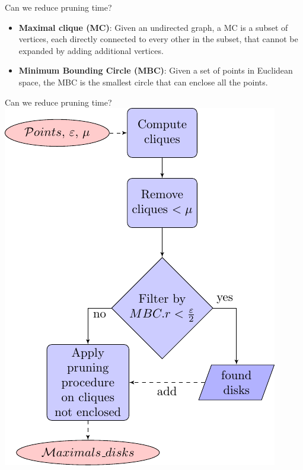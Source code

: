 \documentclass{beamer}
\begin{document}
    \begin{frame}{Can we reduce pruning time?}
        \begin{itemize}
            \item \textbf{Maximal clique (MC)}: Given an undirected graph, a MC is a subset of vertices, each directly connected to every other in the subset, 
that cannot be expanded by adding additional vertices.
            \item \textbf{Minimum Bounding Circle (MBC)}: Given a set of points in Euclidean space, the MBC is the smallest circle that can enclose all the 
points. 
        \end{itemize}
    \end{frame}

    \begin{frame}{Can we reduce pruning time?}
        \centering
        \includegraphics[height=0.85\textheight]
                {../thesis/chapter4/figures/plots/10_cmbc_variants/CMBC_flowchart2}
    \end{frame}
\end{document}
